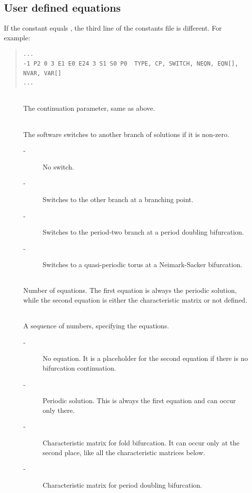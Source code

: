 \documentclass[10pt,a4paper]{ddedoc}
\begin{document}
\subsection{User defined equations}
If the  constant equals , the third line of the constants file is different. For example:
{ \small \begin{quote} \begin{lstlisting}[basicstyle=\tt,frame=single]
...
-1 P2 0 3 E1 E0 E24 3 S1 S0 P0  TYPE, CP, SWITCH, NEQN, EQN[], NVAR, VAR[]
...
\end{lstlisting} \end{quote} } \noindent
\begin{description}
\item[] ~\\
	The continuation parameter, same as above.
%
\item[] ~\\
	The software switches to another branch of solutions if it is non-zero.
\begin{description}
\item[ -] No switch.
\item[ -] Switches to the other branch at a branching point. %
\item[ -] Switches to the period-two branch at a period doubling bifurcation.
\item[ -] Switches to a quasi-periodic torus at a Neimark-Sacker bifurcation.
\end{description}
\item[] ~\\
	Number of equations. The first equation is always the periodic solution, 
	while the second equation is either the characteristic matrix or not defined.
\item[] ~\\
	A sequence of numbers, specifying the equations.
\begin{description}
\item[ -] No equation. It is a placeholder for the second equation if there is no bifurcation continuation.
\item[ -] Periodic solution. This is always the first equation and can occur only there.
\item[ -] Characteristic matrix for fold bifurcation. It can occur only at the second place, like all the characteristic matrices below.
\item[ -] Characteristic matrix for period doubling bifurcation.

\end{description}
\end{description}
\end{document}
